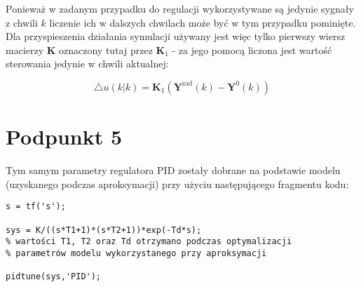 Ponieważ w zadanym przypadku do regulacji wykorzystywane są jedynie sygnały z chwili $k$ liczenie ich w dalszych chwilach może być w tym przypadku pominięte. Dla przyspieszenia działania symulacji używany jest więc tylko pierwszy wiersz macierzy $\boldsymbol{K}$ oznaczony tutaj przez $\boldsymbol{K}_1$ - za jego pomocą liczona jest wartość sterowania jedynie w chwili aktualnej:

\begin{equation}
	\triangle u(k|k) = \boldsymbol{K}_1 (\boldsymbol{Y}^{\mathrm{zad}}(k) - \boldsymbol{Y}^{0}(k))
\end{equation}

\chapter{Podpunkt 5}

Tym samym parametry regulatora PID zostały dobrane na podstawie modelu (uzyskanego podczas aproksymacji) przy użyciu następującego fragmentu kodu:

\begin{lstlisting}[style=Matlab-editor]
s = tf('s');

sys = K/((s*T1+1)*(s*T2+1))*exp(-Td*s);
% wartości T1, T2 oraz Td otrzymano podczas optymalizacji
% parametrów modelu wykorzystanego przy aproksymacji

pidtune(sys,'PID');
\end{lstlisting} 

